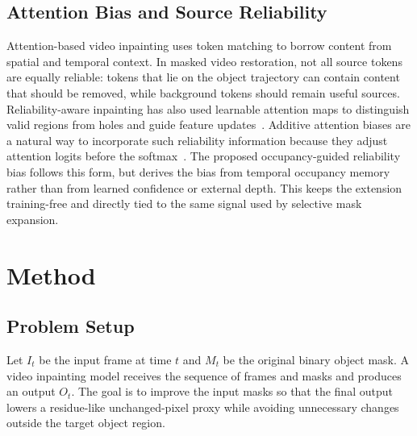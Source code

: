 \documentclass[nouppercase]{kaia}
\begin{document}
\subsection{Attention Bias and Source Reliability}
Attention-based video inpainting uses token matching to borrow content from spatial and temporal context. In masked video restoration, not all source tokens are equally reliable: tokens that lie on the object trajectory can contain content that should be removed, while background tokens should remain useful sources. Reliability-aware inpainting has also used learnable attention maps to distinguish valid regions from holes and guide feature updates~\cite{xie2019lbam}. Additive attention biases are a natural way to incorporate such reliability information because they adjust attention logits before the softmax~\cite{vaswani2017attention}. The proposed occupancy-guided reliability bias follows this form, but derives the bias from temporal occupancy memory rather than from learned confidence or external depth. This keeps the extension training-free and directly tied to the same signal used by selective mask expansion.

\section{Method}
\subsection{Problem Setup}
Let $I_t$ be the input frame at time $t$ and $M_t$ be the original binary object mask. A video inpainting model receives the sequence of frames and masks and produces an output $O_t$. The goal is to improve the input masks so that the final output lowers a residue-like unchanged-pixel proxy while avoiding unnecessary changes outside the target object region.
\end{document}
